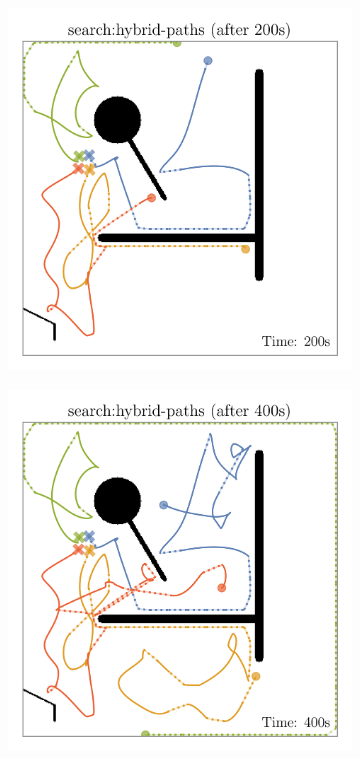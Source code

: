 \def\w{0.329\textwidth}
\begin{figure}[H]
    \centering
    \begin{subfigure}[b]{\w}
        \centering
        \includegraphics[width=\textwidth]{./figures/plots/paths/search:hybrid-paths-(after-200s).png}
    \end{subfigure}
    \begin{subfigure}[b]{\w}
        \centering
        \includegraphics[width=\textwidth]{./figures/plots/paths/search:hybrid-paths-(after-400s).png}

\end{subfigure}
\end{figure}
